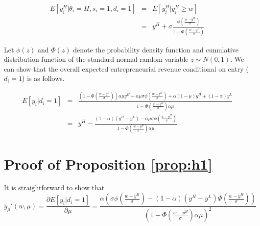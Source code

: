 \documentclass[letterpaper,12pt]{article}
\begin{document}
\begin{eqnarray}
E\left[y^{H}_{i}\vert \theta_{i}=H,s_{i}=1,d_{i}=1\right] &=& E\left[y^{H}_{i}\vert y^{H}_{i}\geq w\right] \\
&=& y^{H} + \sigma\frac{\phi\left(\frac{w-y^{H}}{\sigma}\right)}{1-\Phi\left(\frac{w-y^{H}}{\sigma}\right)}
\end{eqnarray}



Let $\phi(z)$ and $\Phi(z)$ denote the probability density function and cumulative distribution function of the standard normal random variable $z\sim N(0,1)$. We can show that the overall expected entrepreneurial revenue conditional on entry ($d_{i}=1$) is as follows. 

\begin{eqnarray}
    E[y_{i}\vert d_{i}=1] &=& \frac{\left(1-\Phi\left(\frac{w-y^{H}}{\sigma}\right)\right)\alpha\mu y^{H}+\alpha\mu\sigma\phi\left(\frac{w-y^{H}}{\sigma}\right)+\alpha(1-\mu)y^{H}+(1-\alpha)y^{L}}{1-\Phi\left(\frac{w-y^{H}}{\sigma}\right)\alpha\mu} \\
    &=& y^{H}-\frac{(1-\alpha)(y^{H}-y^{L})-\alpha\mu\sigma\phi\left(\frac{w-y^{H}}{\sigma}\right)}{1-\Phi\left(\frac{w-y^{H}}{\sigma}\right)\alpha\mu}
\end{eqnarray}



\section{Proof of Proposition \ref{prop:h1}}


It is straightforward to show that 
\begin{equation}
    \bar{y}_{\mu}'(w,\mu) = \frac{\partial E\left[y_{i}\vert d_{i}=1\right]}{\partial\mu} = \frac{\alpha\left(\sigma\phi\left(\frac{w-y^{H}}{\sigma}\right)-(1-\alpha)(y^{H}-y^{L})\Phi\left(\frac{w-y^{H}}{\sigma}\right)\right)}{\left(1-\Phi\left(\frac{w-y^{H}}{\sigma}\right)\alpha\mu\right)^{2}}
\end{equation}
\end{document}
